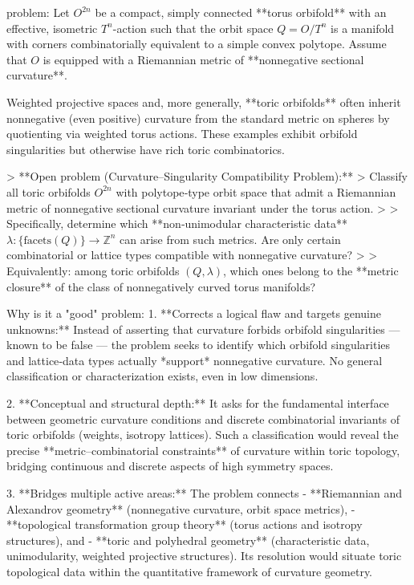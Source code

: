 problem:  
Let \( O^{2n} \) be a compact, simply connected **torus orbifold** with an effective, isometric \(T^n\)-action such that the orbit space \( Q = O / T^n \) is a manifold with corners combinatorially equivalent to a simple convex polytope.  
Assume that \(O\) is equipped with a Riemannian metric of **nonnegative sectional curvature**.

Weighted projective spaces and, more generally, **toric orbifolds** often inherit nonnegative (even positive) curvature from the standard metric on spheres by quotienting via weighted torus actions. These examples exhibit orbifold singularities but otherwise have rich toric combinatorics.

> **Open problem (Curvature–Singularity Compatibility Problem):**  
> Classify all toric orbifolds \( O^{2n} \) with polytope‑type orbit space that admit a Riemannian metric of nonnegative sectional curvature invariant under the torus action.  
>  
> Specifically, determine which **non‑unimodular characteristic data** \(\lambda : \{\text{facets}(Q)\}\to\mathbb{Z}^n\) can arise from such metrics. Are only certain combinatorial or lattice types compatible with nonnegative curvature?  
>  
> Equivalently: among toric orbifolds \( (Q,\lambda) \), which ones belong to the **metric closure** of the class of nonnegatively curved torus manifolds?

Why is it a "good" problem:  
1. **Corrects a logical flaw and targets genuine unknowns:**  
   Instead of asserting that curvature forbids orbifold singularities — known to be false — the problem seeks to identify which orbifold singularities and lattice‑data types actually *support* nonnegative curvature. No general classification or characterization exists, even in low dimensions.

2. **Conceptual and structural depth:**  
   It asks for the fundamental interface between geometric curvature conditions and discrete combinatorial invariants of toric orbifolds (weights, isotropy lattices). Such a classification would reveal the precise **metric–combinatorial constraints** of curvature within toric topology, bridging continuous and discrete aspects of high symmetry spaces.

3. **Bridges multiple active areas:**  
   The problem connects  
   - **Riemannian and Alexandrov geometry** (nonnegative curvature, orbit space metrics),  
   - **topological transformation group theory** (torus actions and isotropy structures), and  
   - **toric and polyhedral geometry** (characteristic data, unimodularity, weighted projective structures).  
   Its resolution would situate toric topological data within the quantitative framework of curvature geometry.

